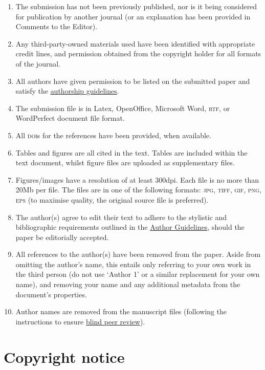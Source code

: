 \documentclass[charis,linguex]{glossa}
\begin{document}
\begin{enumerate}[label=\arabic*.]
\item The submission has not been previously published, nor is it being considered for publication by another journal (or an explanation has been provided in Comments to the Editor).
\item Any third-party-owned materials used have been identified with appropriate credit lines, and permission obtained from the copyright holder for all formats of the journal.
\item All authors have given permission to be listed on the submitted paper and satisfy the \href{http://glossa.ubiquitypress.com/about/authorship/}{authorship guidelines}. 
\item The submission file is in Latex, OpenOffice, Microsoft Word, \textsc{rtf}, or WordPerfect document file format.
\item All \textsc{doi}s for the references have been provided, when available.
\item Tables and figures are all cited in the text. Tables are included within the text document, whilst figure files are uploaded as supplementary files.
\item Figures/images have a resolution of at least 300dpi. Each file is no more than 20Mb per file. The files are in one of the following formats: \textsc{jpg, tiff, gif, png, eps} (to maximise quality, the original source file is preferred).
\item The author(s) agree to edit their text to adhere to the stylistic and bibliographic requirements outlined in the \href{https://www.glossa-journal.org/about/submissions#authorGuidelines}{Author Guidelines}, should the paper be editorially accepted.
\item All references to the author(s) have been removed from the paper. Aside from omitting the author’s name, this entails only referring to your own work in the third person (do not use `Author 1’ or a similar replacement for your own name), and removing your name and any additional metadata from the document’s properties.
\item Author names are removed from the manuscript files (following the instructions to ensure \href{https://www.glossa-journal.org/help/view/editorial/topic/000044}{blind peer review}).

\end{enumerate}

\section{Copyright notice}
\end{document}

